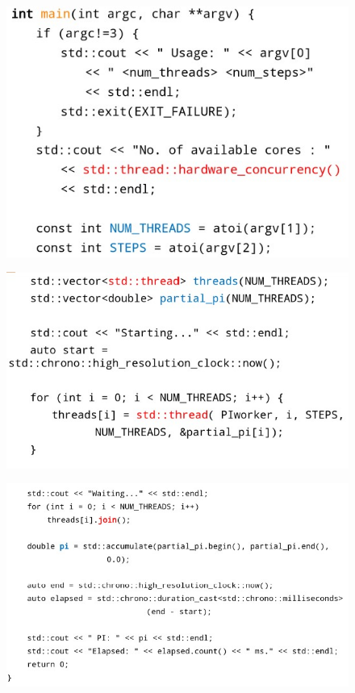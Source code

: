 \begin{figure}[h!]
		\centering
		\includegraphics[scale = 0.8]{img/pi_main1.jpg}
        \label{pi_thread}
\end{figure}

\begin{figure}[h!]
		\centering
		\includegraphics[scale = 0.8]{img/pi_main2.jpg}
        \label{pi_thread}
\end{figure}

\begin{figure}[h!]
		\centering
		\includegraphics[scale = 0.8]{img/pi_main3.jpg}
        \label{pi_thread}
\end{figure}

